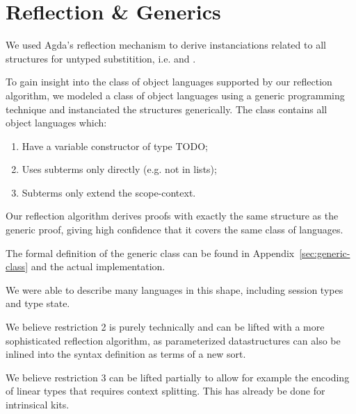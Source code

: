 \documentclass[sigplan,10pt, anonymous]{acmart}
\newcommand*\ACode[1]{\AgdaFontStyle{\textcolor{mygray}{#1}}}
\newcommand*\ACon[1]{\AgdaInductiveConstructor{#1}}
\begin{document}

  \section{Reflection \& Generics}
  \label{sec:reflection}
  We used Agda's reflection mechanism\cite{TODO} to derive
  instanciations related to all structures for untyped substitition,
  i.e. \ACode{\ACon{Traversal}} and \ACode{\ACon{ComposeTraversal}}.

  To gain insight into the class of object languages supported by our
  reflection algorithm, we modeled a class of object languages using a
  generic programming technique and instanciated the structures
  generically. The class contains all object languages which:
  \begin{enumerate}
  \item Have a variable constructor of type TODO;
  \item Uses subterms only directly (e.g. not in lists);
  \item Subterms only extend the scope-context.
  \end{enumerate}

  Our reflection algorithm derives proofs with exactly the same
  structure as the generic proof, giving high confidence that it covers
  the same class of languages.

  The formal definition of the generic class can be found in
  Appendix~\ref{sec:generic-class} and the actual implementation.

  We were able to describe many languages in this shape, including
  session types and type state.

  We believe restriction 2 is purely technically and can be lifted
  with a more sophisticated reflection algorithm, as parameterized
  datastructures can also be inlined into the syntax definition as terms
  of a new sort.

  We believe restriction 3 can be lifted partially to allow for
  example the encoding of linear types that requires context
  splitting. This has already be done for intrinsical kits\cite{TODO}.
\end{document}
